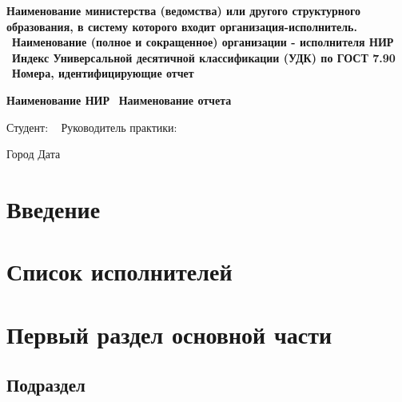 \documentclass{article}
\begin{document}
\begin{center}
\Large{\textbf{Наименование министерства (ведомства) или другого структурного образования, в систему которого входит организация-исполнитель.}} \
\Large{\textbf{Наименование (полное и сокращенное) организации - исполнителя НИР}} \
\Large{\textbf{Индекс Универсальной десятичной классификации (УДК) по ГОСТ 7.90}} \
\Large{\textbf{Номера, идентифицирующие отчет}} \
\end{center}

\vspace{1cm}

\begin{center}
\Large{\textbf{Наименование НИР}} \
\Large{\textbf{Наименование отчета}} \
\end{center}

\vspace{5cm}

\begin{flushleft}
\Large{Студент: \underline{\hspace{6cm}}\ }\newline
\Large{Руководитель практики: \underline{\hspace{6cm}}}
\end{flushleft}

\vspace{9cm}

\begin{center}
\Large{Город Дата}
\end{center}

\newpage

\tableofcontents

\newpage %


\section*{Введение}

\newpage

\section*{Список исполнителей}

\newpage

\section{Первый раздел основной части}
\subsection{Подраздел}
\end{document}
